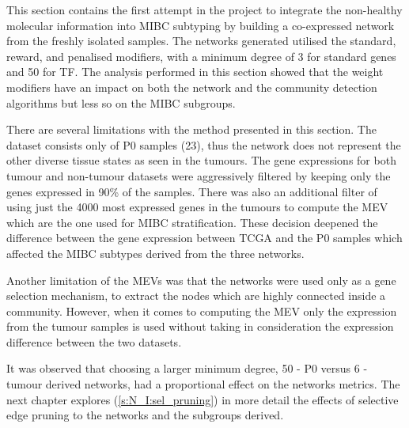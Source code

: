 This section contains the first attempt in the project to integrate the non-healthy molecular information into MIBC subtyping by building a co-expressed network from the freshly isolated samples. The networks generated utilised the standard, reward, and penalised modifiers, with a minimum degree of 3 for standard genes and 50 for TF. The analysis performed in this section showed that the weight modifiers have an impact on both the network and the community detection algorithms but less so on the MIBC subgroups. 

There are several limitations with the method presented in this section. The dataset consists only of P0 samples (23), thus the network does not represent the other diverse tissue states as seen in the tumours. The gene expressions for both tumour and non-tumour datasets were aggressively filtered by keeping only the genes expressed in 90\% of the samples. There was also an additional filter of using just the 4000 most expressed genes in the tumours to compute the MEV which are the one used for MIBC stratification. These decision deepened the difference between the gene expression between TCGA and the P0 samples which affected the MIBC subtypes derived from the three networks.

Another limitation of the MEVs was that the networks were used only as a gene selection mechanism, to extract the nodes which are highly connected inside a community. However, when it comes to computing the MEV only the expression from the tumour samples is used without taking in consideration the expression difference between the two datasets.

It was observed that choosing a larger minimum degree, 50 - P0 versus 6 - tumour derived networks, had a proportional effect on the networks metrics. The next chapter explores (\cref{s:N_I:sel_pruning}) in more detail the effects of selective edge pruning to the networks and the subgroups derived. 







